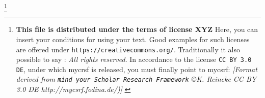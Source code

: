 %
%
%

\footnote{\textbf{This file is distributed under the terms of license XYZ}
Here, you can insert your conditions for using your text. Good examples
for such licenses are offered under \texttt{https://creativecommons.org/}. 
Traditionally it also possible to say : \emph{All rights reserved}.
In accordance to the license \texttt{CC BY 3.0 DE}, under which mycrsf
is released, you must finally point to mycsrf:
\newline 
{ \tiny \itshape [Format derived from \texttt{mind your Scholar Research
Framework} \copyright K. Reincke CC BY 3.0 DE http://mycsrf.fodina.de/)] }}


